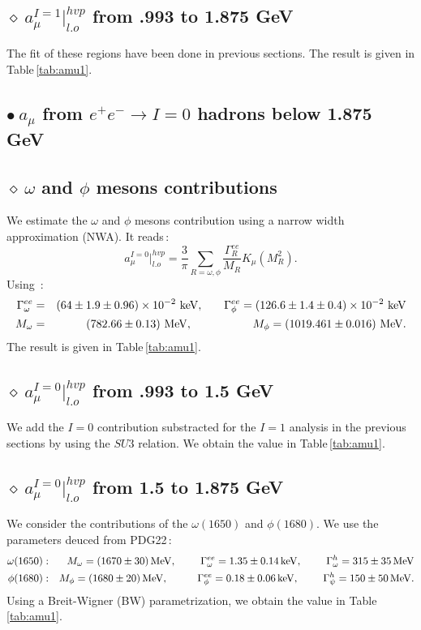 \documentclass[review]{elsarticle}
\def\beq{\begin{equation}}
\def\eeq{\end{equation}}
\def\bea{\begin{eqnarray}}
\def\eea{\end{eqnarray}}
\def\nnb{\nonumber}
\def\nnb{\nonumber}
\def\b{$\bullet~$}
\def\d{$\diamond~$}
\begin{document}
\subsection*{\hspace*{0.5cm}\d   $a_\mu^{I=1}\vert^{hvp}_{l.o}$ from .993 to 1.875 GeV}
The fit of these regions have been done in previous sections. The result is given in Table\,\ref{tab:amu1}.
\subsection*{\b $a_\mu$ from   $e^+e^-\to I=0$ hadrons below 1.875 GeV}
\subsection*{\hspace*{0.5cm}\d  $\omega$ and $\phi$ mesons contributions}
We estimate the $\omega$ and $\phi$ mesons contribution using a narrow width approximation (NWA). It reads\,\cite{SNamu}:
\beq
a_\mu^{I=0}\vert^{hvp}_{l.o}= \frac{3}{\pi}\sum_{R=\omega,\phi}\frac{\Gamma^{ee}_R}{M_R} K_\mu(M_R^2).
\eeq
Using\,\cite{PDG} :
\bea
\Gamma^{ee}_\omega &=& (64\pm 1.9\pm 0.96)\times 10^{-2}~{\rm keV},\,\,\,\,\,\,\,\,\,\,\,\Gamma^{ee}_\phi = (126.6\pm 1.4\pm 0.4)\times 10^{-2}~{\rm keV}\nnb\\
M_\omega&=&(782.66\pm 0.13)~{\rm MeV},\,\,\,\,\,\,\,\,\,\,\,   \,\,\,\,\,\,\,\,\,\,\,  \,\,\,\,\,\,\,\,\,\, M_\phi=(1019.461\pm 0.016)~{\rm MeV}.
\eea
The result is given in Table\,\ref{tab:amu1}.
\subsection*{\hspace*{0.5cm}\d   $a_\mu^{I=0}\vert^{hvp}_{l.o}$ from .993 to 1.5 GeV}
We add the $I=0$ contribution  substracted  for the $I=1$ analysis in the previous sections by using  the $SU3$ relation. We obtain the value in Table\,\ref{tab:amu1}. 

\subsection*{\hspace*{0.5cm}\d   $a_\mu^{I=0}\vert^{hvp}_{l.o}$ from 1.5 to 1.875 GeV}
We consider the contributions of the $\omega(1650)$ and $\phi(1680)$. We use the parameters deuced from PDG22\,\cite{PDG}:
\bea
\omega(1650)&:&  M_\omega=(1670\pm 30)\,{\rm MeV},\,\,\,\,\,\,        \,\,\,\,\,  \,\,\,\Gamma^{ee}_\omega=1.35\pm 0.14\,{\rm keV},\,\,\,\,\,\,  \,\,\,\,\,\,  \,\,\Gamma^{h}_\omega=315\pm 35\,{\rm MeV} \nnb\\
\phi(1680)&:&  M_\phi=(1680\pm 20)\,{\rm MeV},\,\,\,\,\,\,   \,\,\,     \,\,\,\,\,  \,\,\,\Gamma^{ee}_\phi=0.18\pm 0.06\,{\rm keV},\,\,\,\,\,\,  \,\,\,\,\,\,  \,\,\Gamma^{h}_\psi=150\pm 50\,{\rm MeV}.
\eea
Using a Breit-Wigner (BW) parametrization, we  obtain the value in Table\,\ref{tab:amu1}. 
\end{document}
